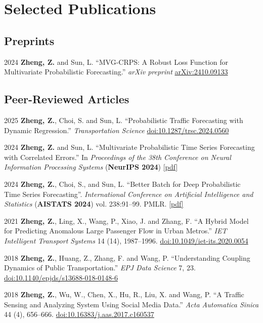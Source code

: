 \documentclass[12pt,letterpaper]{report}
\begin{document}
    \section*{Selected Publications}
    \subsection*{Preprints}
    \begin{tablist}
        \item[2024] \tab \textbf{Zheng, Z.} and Sun, L. \enquote{MVG-CRPS: A Robust Loss Function for Multivariate Probabilistic Forecasting.} \textit{arXiv preprint} \href{https://arxiv.org/abs/2410.09133}{arXiv:2410.09133}
    \end{tablist}

    \subsection*{Peer-Reviewed Articles}
    \begin{tablist}
        \item[2025] \tab \textbf{Zheng, Z.}, Choi, S. and Sun, L. \enquote{Probabilistic Traffic Forecasting with Dynamic Regression.} \textit{Transportation Science} \href{https://pubsonline.informs.org/doi/abs/10.1287/trsc.2024.0560}{doi:10.1287/trsc.2024.0560}
        \item[2024] \tab \textbf{Zheng, Z.} and Sun, L. \enquote{Multivariate Probabilistic Time Series Forecasting with Correlated Errors.} In \textit{Proceedings of the 38th Conference on Neural Information Processing Systems} (\textbf{NeurIPS 2024}) \href{https://papers.nips.cc/paper_files/paper/2024/file/619b8e3ead58dce90bc615f2a7d5d102-Paper-Conference.pdf}{[pdf]}
        \item[2024] \tab \textbf{Zheng, Z.}, Choi, S., and Sun, L. \enquote{Better Batch for Deep Probabilistic Time Series Forecasting}. \textit{International Conference on Artificial Intelligence and Statistics} (\textbf{AISTATS 2024}) vol. 238:91--99. PMLR. \href{https://proceedings.mlr.press/v238/zheng24a.html}{[pdf]}
        \item[2021] \tab \textbf{Zheng, Z.}, Ling, X., Wang, P., Xiao, J. and Zhang, F. \enquote{A Hybrid Model for Predicting Anomalous Large Passenger Flow in Urban Metros.} \textit{IET Intelligent Transport Systems} 14 (14), 1987--1996. \href{https://doi.org/10.1049/iet-its.2020.0054}{doi:10.1049/iet-its.2020.0054}
        \item[2018] \tab \textbf{Zheng, Z.}, Huang, Z., Zhang, F. and Wang, P. \enquote{Understanding Coupling Dynamics of Public Transportation.} \textit{EPJ Data Science} 7, 23. \href{https://doi.org/10.1140/epjds/s13688-018-0148-6}{doi:10.1140/epjds/s13688-018-0148-6}
        \item[2018] \tab \textbf{Zheng, Z.}, Wu, W., Chen, X., Hu, R., Liu, X. and Wang, P. \enquote{A Traffic Sensing and Analyzing System Using Social Media Data.} \textit{Acta Automatica Sinica} 44 (4), 656--666. \href{http://dx.doi.org/10.16383/j.aas.2017.c160537}{doi:10.16383/j.aas.2017.c160537}
    \end{tablist}
\end{document}
